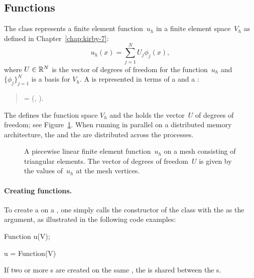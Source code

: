 \subsection{Functions}

The  class represents a finite element
function~$u_h$ in a finite element space~$V_h$ as defined in
Chapter~\ref{chap:kirby-7}:
\begin{equation}
  u_h(x) = \sum_{j=1}^N U_j \phi_j(x),
\end{equation}
where $U \in \mathbb{R}^N$ is the vector of degrees of freedom for the
function~$u_h$ and $\{\phi_j\}_{j=1}^N$ is a basis for $V_h$.  A
 is represented in terms of a  and a
:
\begin{verse}
  \centering
   = (,\; ).
\end{verse}
The  defines the function space $V_h$ and the
 holds the vector~$U$ of degrees of freedom; see
Figure~\ref{fig:logg-2:femsolution}. When running in parallel on a
distributed memory architecture, the  and the
 are distributed across the processes.

\begin{figure}
\bwfig
  \centering
  \caption{A piecewise linear finite element function~$u_h$ on a
    mesh consisting of triangular elements. The vector of degrees of
    freedom~$U$ is given by the values of~$u_h$ at the mesh
    vertices.}
  \label{fig:logg-2:femsolution}
\end{figure}

\enlargethispage{12pt}

\paragraph{Creating functions.}

To create a  on a , one simply calls
the constructor of the  class with the 
as the argument, as illustrated in the following code examples:
\begin{c++}
Function u(V);
\end{c++}
\begin{python}
u = Function(V)
\end{python}
If two or more s are created on the same
, the  is shared between the
s.

